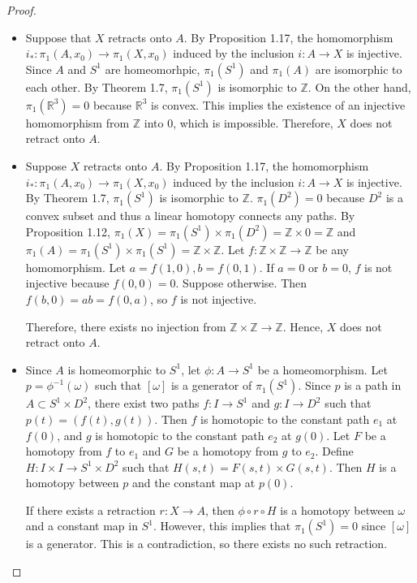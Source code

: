 \documentclass[12pt, psamsfonts]{amsart}
\theoremstyle{definition}
\theoremstyle{remark}
\numberwithin{equation}{section}
\begin{document}
\begin{proof}
  $ $
  \begin{itemize}
    \item
      Suppose that $X$ retracts onto $A$.
      By Proposition 1.17, the homomorphism $i_*: \pi_1(A, x_0) \rightarrow \pi_1(X, x_0)$ induced by the inclusion $i: A \rightarrow X$ is injective.
      Since $A$ and $S^1$ are homeomorhpic, $\pi_1(S^1)$ and $\pi_1(A)$ are isomorphic to each other.
      By Theorem 1.7, $\pi_1(S^1)$ is isomorphic to $\mathbb{Z}$.
      On the other hand, $\pi_1(\mathbb{R}^3) = 0$ because $\mathbb{R}^3$ is convex.
      This implies the existence of an injective homomorphism from $\mathbb{Z}$ into $0$, which is impossible.
      Therefore, $X$ does not retract onto $A$.
    \item
      Suppose $X$ retracts onto $A$.
      By Proposition 1.17, the homomorphism $i_*: \pi_1(A, x_0) \rightarrow \pi_1(X, x_0)$ induced by the inclusion $i: A \rightarrow X$ is injective.
      By Theorem 1.7, $\pi_1(S^1)$ is isomorphic to $\mathbb{Z}$.
      $\pi_1(D^2) = 0$ because $D^2$ is a convex subset and thus a linear homotopy connects any paths.
      By Proposition 1.12, $\pi_1(X) = \pi_1(S^1) \times \pi_1(D^2) = \mathbb{Z} \times 0 = \mathbb{Z}$ and $\pi_1(A) = \pi_1(S^1) \times \pi_1(S^1) = \mathbb{Z} \times \mathbb{Z}$.
      Let $f: \mathbb{Z} \times \mathbb{Z} \rightarrow \mathbb{Z}$ be any homomorphism.
      Let $a = f(1, 0), b = f(0, 1)$.
      If $a = 0$ or $b = 0$, $f$ is not injective because $f(0, 0) = 0$.
      Suppose otherwise.
      Then $f(b, 0) = ab = f(0, a)$, so $f$ is not injective.

      Therefore, there exists no injection from $\mathbb{Z} \times \mathbb{Z} \rightarrow \mathbb{Z}$.
      Hence, $X$ does not retract onto $A$.
    \item
      Since $A$ is homeomorphic to $S^1$, let $\phi: A \rightarrow S^1$ be a homeomorphism.
      Let $p = \phi^{-1}(\omega)$ such that $[\omega]$ is a generator of $\pi_1(S^1)$.
      Since $p$ is a path in $A \subset S^1 \times D^2$, there exist two paths $f: I \rightarrow S^1$ and $g: I \rightarrow D^2$ such that $p(t) = (f(t), g(t))$.
      Then $f$ is homotopic to the constant path $e_1$ at $f(0)$, and $g$ is homotopic to the constant path $e_2$ at $g(0)$.
      Let $F$ be a homotopy from $f$ to $e_1$ and $G$ be a homotopy from $g$ to $e_2$.
      Define $H : I \times I \rightarrow S^1 \times D^2$ such that $H(s, t) = F(s, t) \times G(s, t)$.
      Then $H$ is a homotopy between $p$ and the constant map at $p(0)$.
      
      If there exists a retraction $r : X \rightarrow A$, then $\phi \circ r \circ H$ is a homotopy between $\omega$ and a constant map in $S^1$.
      However, this implies that $\pi_1(S^1) = 0$ since $[\omega]$ is a generator.
      This is a contradiction, so there exists no such retraction.
  \end{itemize}
\end{proof}
\end{document}
